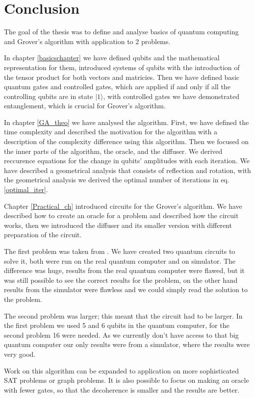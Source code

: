 \chapter{Conclusion}

The goal of the thesis was to define and analyse basics of quantum computing and Grover's algorithm with application to 2 problems.

In chapter \ref{basicschapter} we have defined qubits and the mathematical representation for them, introduced systems of qubits with the introduction of the tensor product for both vectors and matricies. Then we have defined basic quantum gates and controlled gates, which are applied if and only if all the controlling qubits are in state $|1\rangle$, with controlled gates we have demonstrated entanglement, which is crucial for Grover's algorithm. 

In chapter \ref{GA_theo} we have analysed the algorithm. First, we have defined the time complexity and described the motivation for the algorithm with a description of the complexity difference using this algorithm. Then we focused on the inner parts of the algorithm, the oracle, and the diffuser. We derived reccurence equations for the change in qubits' amplitudes with each iteration. We have described a geometrical analysis that consists of reflection and rotation, with the geometrical analysis we derived the optimal number of iterations in eq. \ref{optimal_iter}.

Chapter \ref{Practical_ch} introduced circuits for the Grover's algorithm. We have described how to create an oracle for a problem and described how the circuit works, then we introduced the diffuser and its smaller version with different preparation of the circuit.

The first problem was taken from \cite{qc_grover_ibm}. We have created two quantum circuits to solve it, both were run on the real quantum computer and on simulator. The difference was huge, results from the real quantum computer were flawed, but it was still possible to see the correct results for the problem, on the other hand results from the simulator were flawless and we could simply read the solution to the problem.

The second problem was larger; this meant that the circuit had to be larger. In the first problem we used 5 and 6 qubits in the quantum computer, for the second problem 16 were needed. As we currently don't have access to that big quantum computer our only results were from a simulator, where the results were very good.

Work on this algorithm can be expanded to application on more sophisticated SAT problems or graph problems. It is also possible to focus on making an oracle with fewer gates, so that the decoherence is smaller and the results are better.